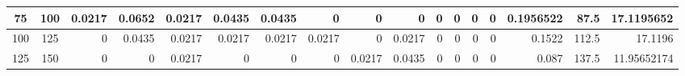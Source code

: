 \begin{table}[ht]
\begin{adjustbox}{width = \textwidth, center}
\begin{tabular}{|cc|r|r|r|r|r|r|r|r|r|r|r|r|r|r|r|}
            \cellcolor[HTML]{D9EAD3}75             & \cellcolor[HTML]{C8E4BE}100            & \cellcolor[HTML]{C7E9D8}0.0217                 & \cellcolor[HTML]{57BB8A}0.0652                 & \cellcolor[HTML]{C7E9D8}0.0217                 & \cellcolor[HTML]{8FD2B1}0.0435                 & \cellcolor[HTML]{8FD2B1}0.0435                 & \cellcolor[HTML]{FFFFFF}0                      & \cellcolor[HTML]{FFFFFF}0                      & \cellcolor[HTML]{FFFFFF}0                       & \cellcolor[HTML]{FFFFFF}0                       & \cellcolor[HTML]{FFFFFF}0                       & \cellcolor[HTML]{FFFFFF}0                       & \cellcolor[HTML]{FFFFFF}0                       & \cellcolor[HTML]{D9D2E9}0.1956522                                               & \cellcolor[HTML]{D9D2E9}87.5                                            & \cellcolor[HTML]{D9D2E9}17.1195652                                                    \\ \hline
            \cellcolor[HTML]{D9EAD3}100            & \cellcolor[HTML]{C8E4BE}125            & \cellcolor[HTML]{FFFFFF}0                      & \cellcolor[HTML]{8FD2B1}0.0435                 & \cellcolor[HTML]{C7E9D8}0.0217                 & \cellcolor[HTML]{C7E9D8}0.0217                 & \cellcolor[HTML]{C7E9D8}0.0217                 & \cellcolor[HTML]{C7E9D8}0.0217                 & \cellcolor[HTML]{FFFFFF}0                      & \cellcolor[HTML]{C7E9D8}0.0217                  & \cellcolor[HTML]{FFFFFF}0                       & \cellcolor[HTML]{FFFFFF}0                       & \cellcolor[HTML]{FFFFFF}0                       & \cellcolor[HTML]{FFFFFF}0                       & \cellcolor[HTML]{D9D2E9}0.1522                                                  & \cellcolor[HTML]{D9D2E9}112.5                                           & \cellcolor[HTML]{D9D2E9}17.1196                                                       \\ \hline
            \rowcolor[HTML]{FFFFFF} 
            \cellcolor[HTML]{D9EAD3}125            & \cellcolor[HTML]{C8E4BE}150            & 0                                              & 0                                              & \cellcolor[HTML]{C7E9D8}0.0217                 & 0                                              & 0                                              & 0                                              & \cellcolor[HTML]{C7E9D8}0.0217                 & \cellcolor[HTML]{8FD2B1}0.0435                  & 0                                               & 0                                               & 0                                               & 0                                               & \cellcolor[HTML]{D9D2E9}0.087                                                   & \cellcolor[HTML]{D9D2E9}137.5                                           & \cellcolor[HTML]{D9D2E9}11.95652174                                                   \\ \hline

\end{tabular}
\end{adjustbox}
\end{table}
